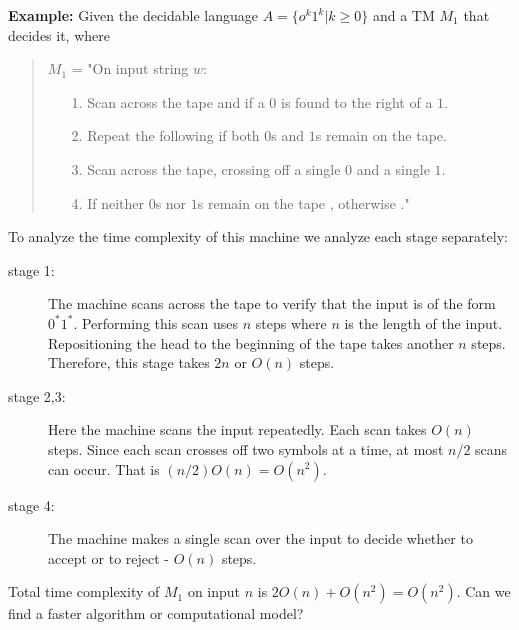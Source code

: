 \documentclass[a4paper,blends,pdf,colorBG,slideColor]{prosper}
\begin{document}
{\small
{\bf Example:} Given the decidable language
$
A = \{ o^k1^k | k \ge 0\}
$
and a TM $M_1$ that decides it, where
\begin{quote}
$M_1$ = "On input string $w$:
\begin{itemize}
\item[1.] Scan across the tape and \reject if a $0$ is found to the right
of a $1$.
\item[2.] Repeat the following if both $0$s and $1$s remain on the tape.
\item[3.]\mytab Scan across the tape, crossing off a single $0$ and a single $1$.
\item[4.] If neither $0$s nor $1$s remain on the tape \accept, otherwise \reject."
\end{itemize}
\end{quote}
To analyze the time complexity of this machine we analyze each stage separately:
\begin{description}
\item[stage 1:] The machine scans across the tape to verify that the input is of the
form $0^*1^*$.  Performing this scan uses $n$ steps where $n$ is the length of the input.
Repositioning the head to the beginning of the tape takes another $n$ steps.
Therefore, this stage takes $2n$ or $O(n)$ steps.
\item[stage 2,3:] Here the machine scans the input repeatedly.  Each scan takes $O(n)$
steps.  Since each scan crosses off two symbols at a time, at most $n/2$ scans
can occur.  That is $(n/2)O(n) = O(n^2)$.
\item[stage 4:] The machine makes a single scan over the input to decide whether to accept
or to reject - $O(n)$ steps.
\end{description}
Total time complexity of $M_1$ on input $n$ is $2O(n) + O(n^2) = O(n^2)$.
Can we find a faster algorithm or computational model?
}
\es
\end{document}
